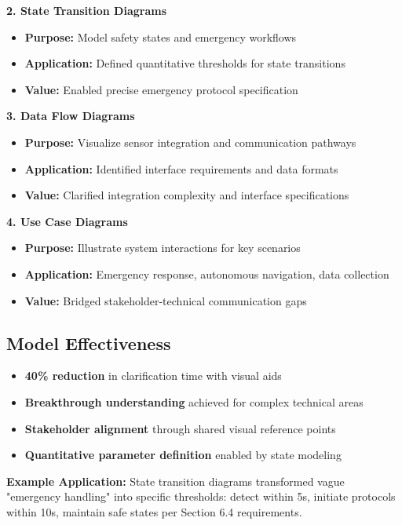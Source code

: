 \documentclass[12pt,a4paper]{article}
\begin{document}
\textbf{2. State Transition Diagrams}
\begin{itemize}
\item \textbf{Purpose:} Model safety states and emergency workflows
\item \textbf{Application:} Defined quantitative thresholds for state transitions
\item \textbf{Value:} Enabled precise emergency protocol specification
\end{itemize}

\textbf{3. Data Flow Diagrams}
\begin{itemize}
\item \textbf{Purpose:} Visualize sensor integration and communication pathways
\item \textbf{Application:} Identified interface requirements and data formats
\item \textbf{Value:} Clarified integration complexity and interface specifications
\end{itemize}

\textbf{4. Use Case Diagrams}
\begin{itemize}
\item \textbf{Purpose:} Illustrate system interactions for key scenarios
\item \textbf{Application:} Emergency response, autonomous navigation, data collection
\item \textbf{Value:} Bridged stakeholder-technical communication gaps
\end{itemize}

\subsection{Model Effectiveness}
\begin{itemize}
\item \textbf{40\% reduction} in clarification time with visual aids
\item \textbf{Breakthrough understanding} achieved for complex technical areas
\item \textbf{Stakeholder alignment} through shared visual reference points
\item \textbf{Quantitative parameter definition} enabled by state modeling
\end{itemize}

\textbf{Example Application:} State transition diagrams transformed vague "emergency handling" into specific thresholds: detect within 5s, initiate protocols within 10s, maintain safe states per Section 6.4 requirements.
\end{document}
